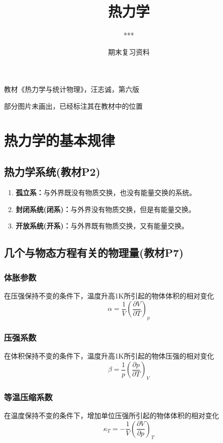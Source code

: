 \documentclass[oneside]{ctexbook}
\title{热力学}
\author{***}
\date{期末复习资料}
\begin{document}
\maketitle

教材《热力学与统计物理》，汪志诚，第六版

部分图片未画出，已经标注其在教材中的位置

\tableofcontents

\chapter{热力学的基本规律}

\section{热力学系统(教材P2)}
\begin{enumerate}
    \item \textbf{孤立系：}与外界既没有物质交换，也没有能量交换的系统。
    \item \textbf{封闭系统(闭系)：}与外界没有物质交换，但是有能量交换。
    \item \textbf{开放系统(开系)：}与外界既有物质交换，又有能量交换。
\end{enumerate}

\section{几个与物态方程有关的物理量(教材P7)}

\subsection{体胀参数}

在压强保持不变的条件下，温度升高1K所引起的物体体积的相对变化
\begin{equation}
\alpha=\dfrac{1}{V}\left(\dfrac{\partial{}V}{\partial{}T}\right)_p
\end{equation}

\subsection{压强系数}

在体积保持不变的条件下，温度升高1K所引起的物体压强的相对变化
\begin{equation}
\beta=\dfrac1p\left(\dfrac{\partial{}p}{\partial{}T}\right)_V
\end{equation}

\subsection{等温压缩系数}
在温度保持不变的条件下，增加单位压强所引起的物体体积的相对变化
\begin{equation}
\kappa_T=-\dfrac{1}{V}\left(\dfrac{\partial{}V}{\partial{p}}\right)_T
\end{equation}
\end{document}
